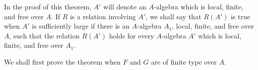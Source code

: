 In the proof of this theorem, \(A'\) will denote an \(A\)-algebra
which is local, finite, and free over \(A\). If \(R\) is a relation
involving \(A'\), we shall say that \(R(A')\) is true when \(A'\)
is sufficiently large if there is an \(A\)-algebra \(A_1\), local,
finite, and free over \(A\), such that the relation \(R(A')\) holds
for every \(A\)-algebra \(A'\) which is local, finite, and free over
\(A_1\).

We shall first prove the theorem when \(F\) and \(G\) are of finite
type over \(A\).
